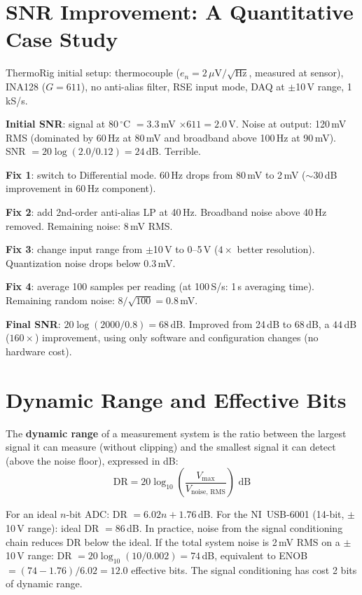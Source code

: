 \documentclass[11pt,letterpaper,twoside,openany]{book}
\newcommand{\degC}{\ensuremath{{}^{\circ}\text{C}}}
\begin{document}
\section{SNR Improvement: A Quantitative Case Study}
ThermoRig initial setup: thermocouple ($e_n = 2\,\mu$V$/\sqrt{\text{Hz}}$, measured at sensor), INA128 ($G = 611$), no anti-alias filter, RSE input mode, DAQ at $\pm$10\,V range, 1\,kS/s.

\textbf{Initial SNR}: signal at 80\,\degC{} $= 3.3$\,mV $\times 611 = 2.0$\,V. Noise at output: 120\,mV RMS (dominated by 60\,Hz at 80\,mV and broadband above 100\,Hz at 90\,mV). SNR $= 20\log(2.0/0.12) = 24$\,dB. Terrible.

\textbf{Fix 1}: switch to Differential mode. 60\,Hz drops from 80\,mV to 2\,mV ($\sim$30\,dB improvement in 60\,Hz component).

\textbf{Fix 2}: add 2nd-order anti-alias LP at 40\,Hz. Broadband noise above 40\,Hz removed. Remaining noise: 8\,mV RMS.

\textbf{Fix 3}: change input range from $\pm$10\,V to 0--5\,V ($4\times$ better resolution). Quantization noise drops below 0.3\,mV.

\textbf{Fix 4}: average 100 samples per reading (at 100\,S/s: 1\,s averaging time). Remaining random noise: $8/\sqrt{100} = 0.8$\,mV.

\textbf{Final SNR}: $20\log(2000/0.8) = 68$\,dB. Improved from 24\,dB to 68\,dB, a $44$\,dB ($160\times$) improvement, using only software and configuration changes (no hardware cost).
\section{Dynamic Range and Effective Bits}
The \textbf{dynamic range} of a measurement system is the ratio between the largest signal it can measure (without clipping) and the smallest signal it can detect (above the noise floor), expressed in dB:
\begin{equation}
\text{DR} = 20\log_{10}\left(\frac{V_{\text{max}}}{V_{\text{noise, RMS}}}\right) \text{ dB}
\end{equation}

For an ideal $n$-bit ADC: DR $= 6.02n + 1.76$\,dB. For the NI~USB-6001 (14-bit, $\pm$10\,V range): ideal DR $= 86$\,dB. In practice, noise from the signal conditioning chain reduces DR below the ideal. If the total system noise is 2\,mV RMS on a $\pm$10\,V range: DR $= 20\log_{10}(10/0.002) = 74$\,dB, equivalent to ENOB $= (74-1.76)/6.02 = 12.0$ effective bits. The signal conditioning has cost 2 bits of dynamic range.
\end{document}
